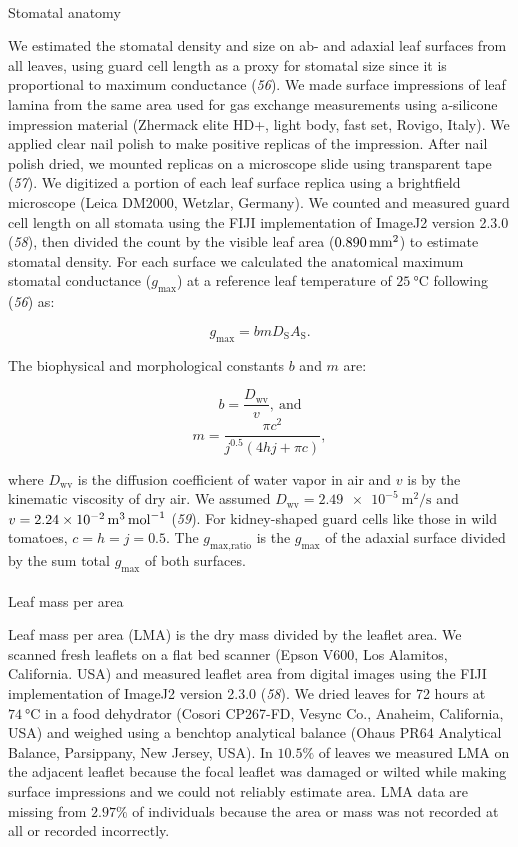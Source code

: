 \documentclass[
  letterpaper,
  DIV=11,
  numbers=noendperiod]{scrartcl}
\makeatletter
\let\oldparagraph\paragraph
\renewcommand{\paragraph}{
    \@ifstar
      \xxxParagraphStar
      \xxxParagraphNoStar
  }
\newcommand{\xxxParagraphStar}[1]{\oldparagraph*{#1}\mbox{}}
\newcommand{\xxxParagraphNoStar}[1]{\oldparagraph{#1}\mbox{}}
\newcommand{\gmax}{$g_\text{max}$}
\newcommand{\gmaxratio}{$g_\text{max,ratio}$}
\makeatother
\begin{document}
\paragraph{Stomatal anatomy}\label{stomatal-anatomy}

We estimated the stomatal density and size on ab- and adaxial leaf
surfaces from all leaves, using guard cell length as a proxy for
stomatal size since it is proportional to maximum conductance
(\emph{56}). We made surface impressions of leaf lamina from the same
area used for gas exchange measurements using a-silicone impression
material (Zhermack elite HD+, light body, fast set, Rovigo, Italy). We
applied clear nail polish to make positive replicas of the impression.
After nail polish dried, we mounted replicas on a microscope slide using
transparent tape (\emph{57}). We digitized a portion of each leaf
surface replica using a brightfield microscope (Leica DM2000, Wetzlar,
Germany). We counted and measured guard cell length on all stomata using
the FIJI implementation of ImageJ2 version 2.3.0 (\emph{58}), then
divided the count by the visible leaf area
(\(\qty{0.890}{\raiseto{2}\milli\meter}\)) to estimate stomatal density.
For each surface we calculated the anatomical maximum stomatal
conductance (\gmax) at a reference leaf temperature of
\(\qty{25}{\degreeCelsius}\) following (\emph{56}) as:

\[g_\mathrm{max} = b m D_\mathrm{S} A_\mathrm{S}.\]

The biophysical and morphological constants \(b\) and \(m\) are:

\[b = \frac{D_\mathrm{wv}}{v},~\text{and}\]
\[m = \frac{\pi c ^ 2}{j^{0.5} (4 h j + \pi c)},\]

where \(D_\mathrm{wv}\) is the diffusion coefficient of water vapor in
air and \(v\) is by the kinematic viscosity of dry air. We assumed
\(D_\mathrm{wv} = \qty{2.49e-5}{\meter\squared\per\second}\) and
\(v = \qty{2.24e-2}{\raiseto{3}\meter\per\mol}\) (\emph{59}). For
kidney-shaped guard cells like those in wild tomatoes,
\(c = h = j = 0.5\). The \gmaxratio{} is the \gmax{} of the adaxial
surface divided by the sum total \gmax{} of both surfaces.

\paragraph{Leaf mass per area}\label{leaf-mass-per-area}

Leaf mass per area (LMA) is the dry mass divided by the leaflet area. We
scanned fresh leaflets on a flat bed scanner (Epson V600, Los Alamitos,
California. USA) and measured leaflet area from digital images using the
FIJI implementation of ImageJ2 version 2.3.0 (\emph{58}). We dried
leaves for 72 hours at \(\qty{74}{\degreeCelsius}\) in a food dehydrator
(Cosori CP267-FD, Vesync Co., Anaheim, California, USA) and weighed
using a benchtop analytical balance (Ohaus PR64 Analytical Balance,
Parsippany, New Jersey, USA). In \(10.5\%\) of leaves we measured LMA on
the adjacent leaflet because the focal leaflet was damaged or wilted
while making surface impressions and we could not reliably estimate
area. LMA data are missing from \(2.97\%\) of individuals because the
area or mass was not recorded at all or recorded incorrectly.
\end{document}
